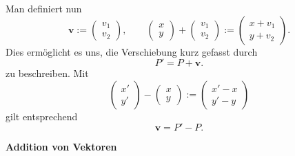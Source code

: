 \documentclass[9pt]{beamer}
\newcommand{\bv}[1]{\mathbf{#1}}
\newcommand{\strong}[1]{\textsf{\textbf{#1}}}
\begin{document}
\begin{frame}
Man definiert nun
\[\bv v := \begin{pmatrix}v_1\\ v_2\end{pmatrix},\qquad
\begin{pmatrix}x\\ y\end{pmatrix} + \begin{pmatrix}v_1\\ v_2\end{pmatrix}
:= \begin{pmatrix}x+v_1\\ y+v_2\end{pmatrix}.\]
Dies ermöglicht es uns, die Verschiebung kurz gefasst durch
\[P' = P + \bv v.\]
zu beschreiben.\pause{} Mit
\[\begin{pmatrix}x'\\ y'\end{pmatrix} - \begin{pmatrix}x\\ y\end{pmatrix}
:= \begin{pmatrix}x'-x\\ y'-y\end{pmatrix}\]
gilt entsprechend
\[\bv v = P' - P.\]
\end{frame}

\begin{frame}
\begin{center}
\strong{Addition von Vektoren}
\end{center}
\end{frame}
\end{document}
